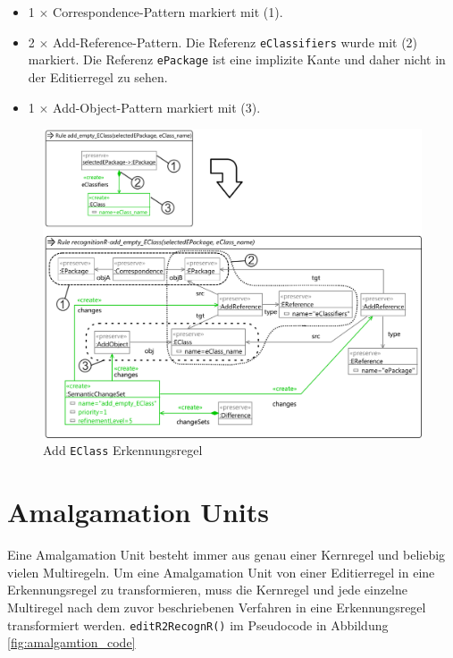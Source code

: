 \begin{itemize}
  \item 1 $\times$ Correspondence-Pattern markiert mit (1).
  \item 2 $\times$ Add-Reference-Pattern. Die Referenz \texttt{eClassifiers} wurde mit (2) markiert.
  Die Referenz \texttt{ePackage} ist eine implizite Kante und daher nicht in der Editierregel zu sehen.
  \item 1 $\times$ Add-Object-Pattern markiert mit (3).
\end{itemize}

\begin{figure}[htbp]
  \centering
  \includegraphics[width=1.0\textwidth]{images/add_eclass_recognition.png}
  \caption{Add \texttt{EClass} Erkennungsregel}
  \label{fig:add_eclass_recognition}
\end{figure}


\section{Amalgamation Units}

Eine Amalgamation Unit besteht immer aus genau einer Kernregel und beliebig vielen Multiregeln.
Um eine Amalgamation Unit von einer Editierregel in eine Erkennungsregel zu transformieren, muss
die Kernregel und jede einzelne Multiregel nach dem zuvor beschriebenen Verfahren in eine
Erkennungsregel transformiert werden. \texttt{editR2RecognR()} im Pseudocode in Abbildung
\ref{fig:amalgamtion_code}

